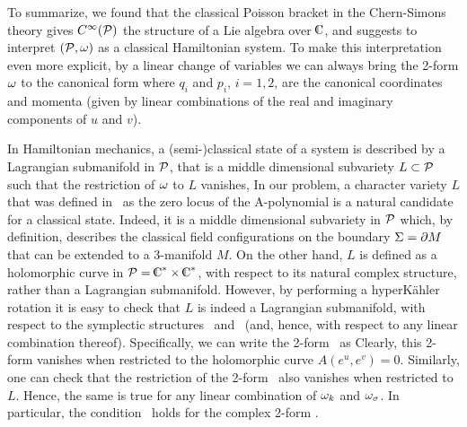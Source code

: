 To summarize, we found that the classical Poisson bracket in
the Chern-Simons theory gives $C^{\infty} ({\cal P})$ the structure
of a Lie algebra over $\IC$, and suggests to interpret
$({\cal P},\omega)$ as a classical Hamiltonian system.
To make this interpretation even more explicit, by a linear change
of variables we can always bring the 2-form $\omega$ to the canonical form
%
\eqn{}
%
where $q_i$ and $p_i$, $i=1,2$, are the canonical coordinates
and momenta (given by linear combinations of the real and imaginary
components of $u$ and $v$).

In Hamiltonian mechanics, a (semi-)classical state of a system is
described by a Lagrangian submanifold in ${\cal P}$, that is
a middle dimensional subvariety $L \subset {\cal P}$ such that
the restriction of $\omega$ to $L$ vanishes,
%
\eqn{}
%
In our problem, a character variety $L$ that was defined
in \locusa\ as the zero locus of the A-polynomial
is a natural candidate for a classical state.
Indeed, it is a middle dimensional subvariety in ${\cal P}$ which,
by definition, describes the classical field configurations
on the boundary ${\Sigma} = \partial M$ that can be extended to a 3-manifold $M$.
On the other hand, $L$ is defined
as a holomorphic curve in $\CP = \IC^* \times \IC^*$,
with respect to its natural complex structure,
rather than a Lagrangian submanifold.
However, by performing a hyperK\"ahler rotation it is easy
to check that $L$ is indeed a Lagrangian submanifold,
with respect to the symplectic structures \komega\ and \somega\
(and, hence, with respect to any linear combination thereof).
Specifically, we can write the 2-form \komega\ as
%
\eqn{}
%
Clearly, this 2-form vanishes
when restricted to the holomorphic curve $A(e^u,e^v)=0$.
Similarly, one can check that the restriction of
the 2-form \somega\ also vanishes
%
\eqn{}
%
when restricted to $L$.
Hence, the same is true for any linear combination of
$\omega_k$ and $\omega_{\sigma}$.
In particular, the condition \lagrcond\ holds for
the complex 2-form \totomega.

